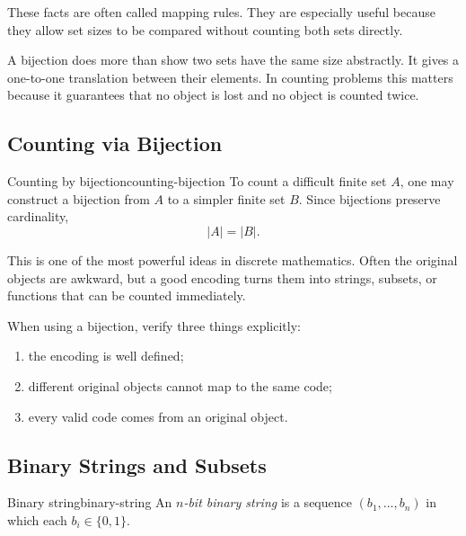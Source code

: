 These facts are often called mapping rules. They are especially useful because they allow set sizes to be compared without counting both sets directly.

\begin{extension}[title={Bijections are exact counting transfers}]
A bijection does more than show two sets have the same size abstractly. It gives a one-to-one translation between their elements. In counting problems this matters because it guarantees that no object is lost and no object is counted twice.
\end{extension}

\subsection{Counting via Bijection}

\begin{definition}{Counting by bijection}{counting-bijection}
To count a difficult finite set $A$, one may construct a bijection from $A$ to a simpler finite set $B$. Since bijections preserve cardinality,
\[
|A|=|B|.
\]
\end{definition}

This is one of the most powerful ideas in discrete mathematics. Often the original objects are awkward, but a good encoding turns them into strings, subsets, or functions that can be counted immediately.

\begin{examtip}[title={Bijection checklist}]
When using a bijection, verify three things explicitly:
\begin{enumerate}[leftmargin=*]
    \item the encoding is well defined;
    \item different original objects cannot map to the same code;
    \item every valid code comes from an original object.
\end{enumerate}
\end{examtip}

\subsection{Binary Strings and Subsets}

\begin{definition}{Binary string}{binary-string}
An \emph{$n$-bit binary string} is a sequence $(b_1,\dots,b_n)$ in which each $b_i\in\{0,1\}$.
\end{definition}

